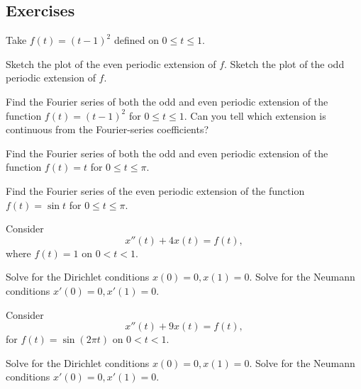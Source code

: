 \subsection{Exercises}

\begin{exercise}
Take $f(t) = {(t-1)}^2$ defined on $0 \leq t \leq 1$.
\begin{tasks}
\task Sketch the plot of the even periodic extension of $f$.
\task Sketch the plot of the odd periodic extension of $f$.
\end{tasks}
\end{exercise}

\begin{exercise}
Find the Fourier series of both the odd and even
periodic extension of 
the function $f(t) = {(t-1)}^2$ for $0 \leq t \leq 1$.
Can you tell which extension is continuous from the Fourier-series
coefficients?
\end{exercise}

\begin{exercise}
Find the Fourier series of both the odd and even periodic extension of 
the function $f(t) = t$ for $0 \leq t \leq \pi$.
\end{exercise}

\begin{exercise}
Find the Fourier series of the even periodic extension of 
the function $f(t) = \sin t$ for $0 \leq t \leq \pi$.
\end{exercise}

\begin{exercise}
\pagebreak[2]
Consider
\begin{equation*}
x''(t) + 4 x(t) = f(t) ,
\end{equation*}
where $f(t) = 1$ on $0 < t < 1$.
\begin{tasks}
\task Solve for the Dirichlet conditions $x(0)=0, x(1) = 0$.
\task Solve for the Neumann conditions $x'(0)=0, x'(1) = 0$.
\end{tasks}
\end{exercise}

\begin{exercise}
Consider
\begin{equation*}
x''(t) + 9 x(t) = f(t) ,
\end{equation*}
for $f(t) = \sin (2\pi t)$ on $0 < t < 1$.
\begin{tasks}
\task Solve for the Dirichlet conditions $x(0)=0, x(1) = 0$.
\task Solve for the Neumann conditions $x'(0)=0, x'(1) = 0$.
\end{tasks}
\end{exercise}

